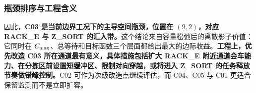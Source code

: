 \subsubsection{瓶颈排序与工程含义}

因此，\textbf{C03 是当前边界工况下的主导空间瓶颈，位置在 $(9,2)$，对应 RACK\_E 与 Z\_SORT 的汇入带。}这个结论来自容量松弛后的离散影子价值：它同时在 $C_{\max}$、总等待和目标函数三个层面都给出最大的边际收益。\textbf{工程上，优先改造 C03 所在通道最有意义，具体措施包括扩大 RACK\_E 附近通道会车能力、在分拣区前设置短缓冲区、限制对向穿越，或将进入 Z\_SORT 的任务释放节奏做错峰控制。}C02 可作为次级改造点继续评估，而 C04、C05 与 C01 更适合保留监测而不是立即扩容。
